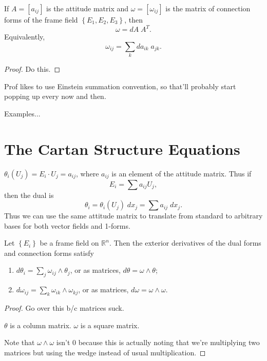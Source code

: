 \documentclass[twoside,10pt]{report}
\begin{document}
\begin{thrm}[]
	If $A=[a_{ij}]$ is the attitude matrix and $\omega=[\omega_{ij}]$ is the matrix of connection forms of the frame field $\left\{ E_1,E_2,E_3 \right\}$, then
	\[
	\omega = dA \; A^T.
	\] 
	Equivalently,
	\[
	\omega_{ij} = \sum_k da_{ik}\;a_{jk}.
	\] 
\end{thrm}
\begin{proof}
	{\color{red}Do this.}
\end{proof}

\begin{note}[]
Prof likes to use Einstein summation convention, so that'll probably start popping up every now and then.
\end{note}

{\color{red}Examples...}


\section{The Cartan Structure Equations}

\begin{ex}[]
	$\theta_i(U_j) = E_i \cdot U_j=a_{ij}$, where $a_{ij}$ is an element of the attitude matrix. Thus if
	\[
	E_i = \sum a_{ij}U_j,
	\] then the dual is
	\[
		\theta_i = \theta_i(U_j) \;dx_j=\sum a_{ij}\;dx_j.
	\] Thus we can use the same attitude matrix to translate from standard to arbitrary bases for both vector fields and 1-forms.
\end{ex}

\begin{thrm}
	Let $\left\{ E_i \right\}$ be a frame field on $\mathbb{R}^n$. Then the exterior derivatives of the dual forms and connection forms satisfy
\begin{enumerate}
	\item $d\theta_i = \sum_j \omega_{ij}\wedge \theta_j$, or as matrices, $d\theta=\omega\wedge\theta$;
	\item $d\omega_{ij}=\sum_k \omega_{ik}\wedge\omega_{kj}$, or as matrices, $d\omega=\omega\wedge\omega$.
\end{enumerate}
\end{thrm}
\begin{proof}
	{\color{red}Go over this b/c matrices suck.}

	{\color{red}$\theta$ is a column matrix. $\omega$ is a square matrix.}

	{\color{red}Note that $\omega\wedge\omega$ isn't 0 because this is actually noting that we're multiplying two matrices but using the wedge instead of usual multiplication.}
\end{proof}
\end{document}

